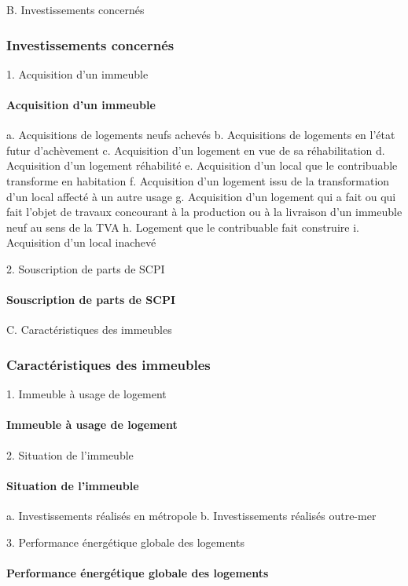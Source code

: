 B. Investissements concernés
		\subsubsection{Investissements concernés}


1. Acquisition d'un immeuble
			\paragraph{Acquisition d'un immeuble}


a. Acquisitions de logements neufs achevés
b. Acquisitions de logements en l'état futur d'achèvement
c. Acquisition d'un logement en vue de sa réhabilitation
d. Acquisition d'un logement réhabilité
e. Acquisition d'un local que le contribuable transforme en habitation
f. Acquisition d'un logement issu de la transformation d'un local affecté à un autre usage
g. Acquisition d'un logement qui a fait ou qui fait l'objet de travaux concourant à la production ou à la livraison d'un immeuble neuf au sens de la TVA
h. Logement que le contribuable fait construire
i. Acquisition d'un local inachevé

2. Souscription de parts de SCPI
			\paragraph{Souscription de parts de SCPI}


C. Caractéristiques des immeubles
		\subsubsection{Caractéristiques des immeubles}


1. Immeuble à usage de logement
			\paragraph{Immeuble à usage de logement}


2. Situation de l'immeuble
			\paragraph{Situation de l'immeuble}

a. Investissements réalisés en métropole
b. Investissements réalisés outre-mer

3. Performance énergétique globale des logements
			\paragraph{Performance énergétique globale des logements}

